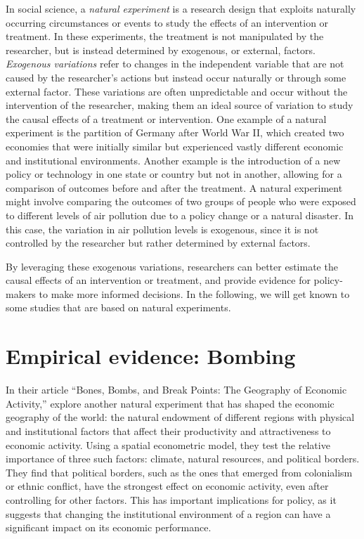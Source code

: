 \documentclass[
  12pt,
  oneside]{book}
\theoremstyle{definition}
\theoremstyle{definition}
\theoremstyle{definition}
\theoremstyle{definition}
\theoremstyle{remark}
\begin{document}
In social science, a \emph{natural experiment} is a research design that exploits naturally occurring circumstances or events to study the effects of an intervention or treatment. In these experiments, the treatment is not manipulated by the researcher, but is instead determined by exogenous, or external, factors. \emph{Exogenous variations} refer to changes in the independent variable that are not caused by the researcher's actions but instead occur naturally or through some external factor. These variations are often unpredictable and occur without the intervention of the researcher, making them an ideal source of variation to study the causal effects of a treatment or intervention.
One example of a natural experiment is the partition of Germany after World War II, which created two economies that were initially similar but experienced vastly different economic and institutional environments. Another example is the introduction of a new policy or technology in one state or country but not in another, allowing for a comparison of outcomes before and after the treatment.
A natural experiment might involve comparing the outcomes of two groups of people who were exposed to different levels of air pollution due to a policy change or a natural disaster. In this case, the variation in air pollution levels is exogenous, since it is not controlled by the researcher but rather determined by external factors.

By leveraging these exogenous variations, researchers can better estimate the causal effects of an intervention or treatment, and provide evidence for policy-makers to make more informed decisions. In the following, we will get known to some studies that are based on natural experiments.

\hypertarget{empirical-evidence-bombing}{%
\section{Empirical evidence: Bombing}\label{empirical-evidence-bombing}}

In their article ``Bones, Bombs, and Break Points: The Geography of Economic Activity,'' \citet{Davis2002Bones} explore another natural experiment that has shaped the economic geography of the world: the natural endowment of different regions with physical and institutional factors that affect their productivity and attractiveness to economic activity. Using a spatial econometric model, they test the relative importance of three such factors: climate, natural resources, and political borders. They find that political borders, such as the ones that emerged from colonialism or ethnic conflict, have the strongest effect on economic activity, even after controlling for other factors. This has important implications for policy, as it suggests that changing the institutional environment of a region can have a significant impact on its economic performance.
\end{document}
